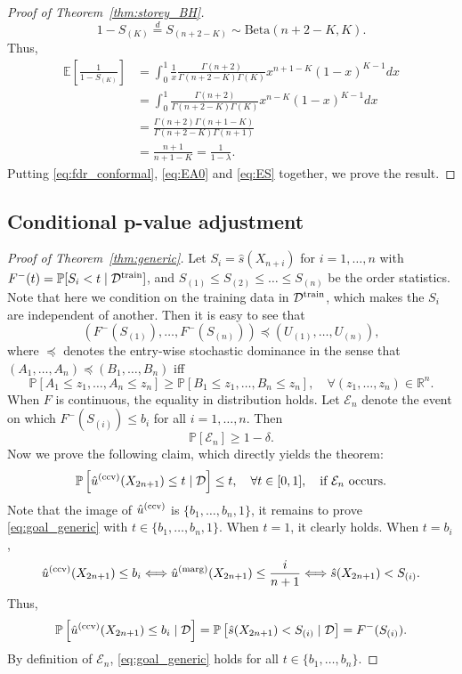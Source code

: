 \documentclass[11pt]{article}
\def\R{\mathbb{R}}
\def\E{\mathbb{E}}
\def\marg{\textnormal{(marg)}}
\def\cond{\textnormal{(ccv)}}
\renewcommand{\P}{\mathbb{P}}
\begin{document}
\begin{proof}[Proof of Theorem~\ref{thm:storey_BH}]
\[1 - S_{(K)}\stackrel{d}{=} S_{(n + 2 - K)}\sim \mathrm{Beta}(n + 2 - K, K).\]
Thus,
\begin{align}
  \E\left[\frac{1}{1 - S_{(K)}}\right]
  &= \int_{0}^{1}\frac{1}{x}\frac{\Gamma(n + 2)}{\Gamma(n + 2 - K)\Gamma(K)}x^{n + 1 - K}(1 - x)^{K - 1}dx\nonumber\\
  & = \int_{0}^{1}\frac{\Gamma(n + 2)}{\Gamma(n + 2 - K)\Gamma(K)}x^{n - K}(1 - x)^{K - 1}dx\nonumber\\
  & = \frac{\Gamma(n + 2)\Gamma(n + 1 - K)}{\Gamma(n + 2 - K)\Gamma(n + 1)}\nonumber\\
  & = \frac{n + 1}{n + 1 - K} = \frac{1}{1 - \lambda}.\label{eq:ES}
\end{align}
Putting \eqref{eq:fdr_conformal}, \eqref{eq:EA0} and \eqref{eq:ES} together, we prove the result.
\end{proof}

\subsection{Conditional p-value adjustment}

\begin{proof}[Proof of Theorem~\ref{thm:generic}]
Let $S_{i} = \hat{s}(X_{n+i})$ for $i = 1, \ldots, n$ with $F^{-}(t) = \P[S_{i} < t\mid \mathcal{D}^\textnormal{train}]$, and $S_{(1)}\le S_{(2)}\le \ldots \le S_{(n)}$ be the order statistics. Note that here we condition on the training data in $\mathcal{D}^\textnormal{train}$, which makes the $S_{i}$ are independent of another. Then it is easy to see that 
\[(F^{-}(S_{(1)}), \ldots, F^{-}(S_{(n)}))\preceq (U_{(1)}, \ldots, U_{(n)}),\]
where $\preceq$ denotes the entry-wise stochastic dominance in the sense that $(A_1, \ldots, A_n) \preceq (B_1, \ldots, B_n)$ iff
\[\P[A_1 \le z_1, \ldots, A_n \le z_n] \ge \P[B_1 \le z_1, \ldots, B_n \le z_n], \quad \forall (z_1, \ldots, z_n)\in \R^n.\]
When $F$ is continuous, the equality in distribution holds. Let $\mathcal{E}_{n}$ denote the event on which $F^-(S_{(i)})\le b_{i}$ for all $i = 1, \ldots, n$. Then 
\[\P[ \mathcal{E}_{n}] \ge 1 - \delta.\]
Now we prove the following claim, which directly yields the theorem:
\begin{equation}\label{eq:goal_generic}
\P\left[\hat{u}^\cond(X_{2n+1})\le t\mid \mathcal{D}\right]\le t, \quad \forall t\in [0, 1], \quad \text{if } \mathcal{E}_{n} \text{ occurs}.
\end{equation}
Note that the image of $\hat{u}^\cond$ is $\{b_1, \ldots, b_n, 1\}$, it remains to prove \eqref{eq:goal_generic} with $t \in \{b_1, \ldots, b_n, 1\}$. When $t = 1$, it clearly holds. When $t = b_i$,
\[\hat{u}^\cond(X_{2n+1})\le b_i\Longleftrightarrow \hat{u}^\marg(X_{2n+1})\le \frac{i}{n+1}\Longleftrightarrow \hat{s}(X_{2n+1}) < S_{(i)}.\]
Thus, 
\[\P\left[\hat{u}^\cond(X_{2n+1})\le b_i\mid \mathcal{D}\right] = \P\left[\hat{s}(X_{2n+1}) < S_{(i)}\mid \mathcal{D}\right] = F^-(S_{(i)}).\]
By definition of $\mathcal{E}_{n}$, \eqref{eq:goal_generic} holds for all $t\in \{b_1, \ldots, b_n\}$.

\end{proof}
\end{document}
